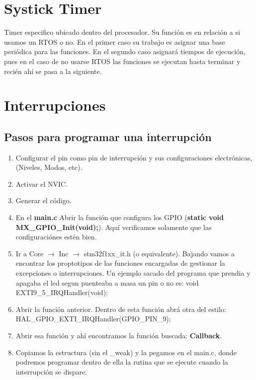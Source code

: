 \documentclass[a4paper,12pt]{report} %
\begin{document}
\section{Systick Timer}


Timer especifico ubicado dentro del procesador. Su función es en relación a si usamos un RTOS o no. En el primer caso su trabajo es asignar una base periódica para las funciones. En el segundo caso asignará tiempos de ejecución, pues en el caso de no usarse RTOS las funciones se ejecutan hasta terminar y recién ahí se pasa a la siguiente.

\section{Interrupciones}

\subsection{Pasos para programar una interrupción}

\begin{enumerate}
	\item Configurar el pin como pin de interrupción y sus configuraciones electrónicas, (Niveles, Modos, etc).
	\item Activar el NVIC.
	\item Generar el código.
	\item En el \textbf{main.c} Abrir la función que configura los GPIO (\textbf{static void MX\_GPIO\_Init(void);}). Aquí verificamos solamente que las configuraciónes estén bien.
	\item Ir a Core $\rightarrow$ Inc $\rightarrow$ stm32f1xx\_it.h (o equivalente). Bajando vamos a encontrar los proptotipos de las funciones encargadas de gestionar la excepciones o interrupciones. Un ejemplo sacado del programa que prendia y apagaba el led segun puenteaba a masa un pin o no es: void EXTI9\_5\_IRQHandler(void);
	\item Abrir la función anterior. Dentro de esta función abrá otra del estilo: HAL\_GPIO\_EXTI\_IRQHandler(GPIO\_PIN\_9);
	\item Abrir esa función y ahí encontramos la función buscada: \textbf{Callback}.
	\item Copiamos la estructura (sin el \_weak) y la pegamos en el main.c, donde podremos programar dentro de ella la rutina que se ejecute cuando la interrupción se dispare.
\end{enumerate}
 
\end{document}
